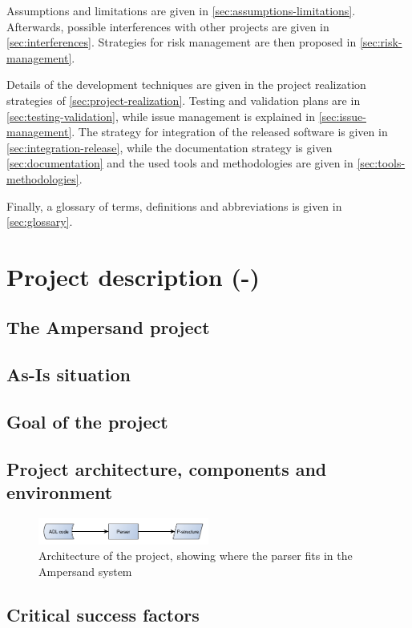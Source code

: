 \documentclass[a4paper,12pt,abstracton,titlepage]{scrartcl}
\begin{document}
Assumptions and limitations are given in \autoref{sec:assumptions-limitations}.
Afterwards, possible interferences with other projects are given in \autoref{sec:interferences}.
Strategies for risk management are then proposed in \autoref{sec:risk-management}.

Details of the development techniques are given in the project realization strategies of \autoref{sec:project-realization}.
Testing and validation plans are in \autoref{sec:testing-validation}, while issue management is explained in \autoref{sec:issue-management}.
The strategy for integration of the released software is given in \autoref{sec:integration-release}, while the documentation strategy is given \autoref{sec:documentation} and the used tools and methodologies are given in \autoref{sec:tools-methodologies}.

Finally, a glossary of terms, definitions and abbreviations is given in \autoref{sec:glossary}.

\section{Project description (-)}
\label{sec:project-description}
\subsection{The Ampersand project}
\subsection{As-Is situation}
\subsection{Goal of the project}
\subsection{Project architecture, components and environment}
\begin{figure}[hb]
  \centering
  \includegraphics[width=0.5\textwidth]{Architecture}
  \caption[Architecture of the project]{Architecture of the project, showing where the parser fits in the Ampersand system}
\end{figure}

\subsection{Critical success factors}
\end{document}

